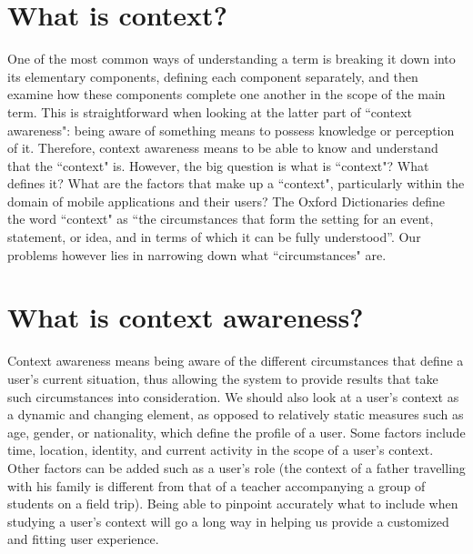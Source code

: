 \section{What is context?}
\label{sec:context}
One of the most common ways of understanding a term is breaking it down into its elementary components, defining each component separately, and then examine how these components complete one another in the scope of the main term. This is straightforward when looking at the latter part of ``context awareness": being aware of something means to possess knowledge or perception of it. Therefore, context awareness means to be able to know and understand that the ``context" is. However, the big question is what is ``context"? What defines it? What are the factors that make up a ``context", particularly within the domain of mobile applications and their users? The Oxford Dictionaries define the word ``context" as ``the circumstances that form the setting for an event, statement, or idea, and in terms of which it can be fully understood''. Our problems however lies in narrowing down what ``circumstances" are.
\section{What is context awareness?}
\label{sec:contextawareness}
Context awareness means being aware of the different circumstances that define a user's current situation, thus allowing the system to provide results that take such circumstances into consideration. We should also look at a user's context as a dynamic and changing element, as opposed to relatively static measures such as age, gender, or nationality, which define the profile of a user. Some factors include time, location, identity, and current activity in the scope of a user's context. Other factors can be added such as a user's role (the context of a father travelling with his family is different from that of a teacher accompanying a group of students on a field trip). Being able to pinpoint accurately what to include when studying a user's context will go a long way in helping us provide a customized and fitting user experience.

